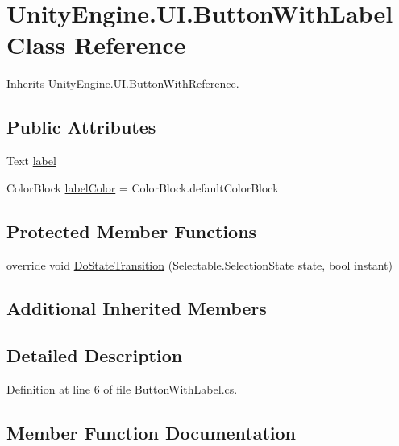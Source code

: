 \hypertarget{class_unity_engine_1_1_u_i_1_1_button_with_label}{}\section{Unity\+Engine.\+U\+I.\+Button\+With\+Label Class Reference}
\label{class_unity_engine_1_1_u_i_1_1_button_with_label}


Inherits \hyperlink{class_unity_engine_1_1_u_i_1_1_button_with_reference}{Unity\+Engine.\+U\+I.\+Button\+With\+Reference}.

\subsection*{Public Attributes}
\begin{DoxyCompactItemize}
\item 
Text \hyperlink{class_unity_engine_1_1_u_i_1_1_button_with_label_aecd902a0a5ba85062006c3d9fa6c5234}{label}
\item 
Color\+Block \hyperlink{class_unity_engine_1_1_u_i_1_1_button_with_label_aacb0782154c37fd55fdde82444a1cbfb}{label\+Color} = Color\+Block.\+default\+Color\+Block
\end{DoxyCompactItemize}
\subsection*{Protected Member Functions}
\begin{DoxyCompactItemize}
\item 
override void \hyperlink{class_unity_engine_1_1_u_i_1_1_button_with_label_a1e7cce2c02143a6a88f6ddacaa87ed07}{Do\+State\+Transition} (Selectable.\+Selection\+State state, bool instant)
\end{DoxyCompactItemize}
\subsection*{Additional Inherited Members}


\subsection{Detailed Description}


Definition at line 6 of file Button\+With\+Label.\+cs.



\subsection{Member Function Documentation}
\hypertarget{class_unity_engine_1_1_u_i_1_1_button_with_label_a1e7cce2c02143a6a88f6ddacaa87ed07}{}
